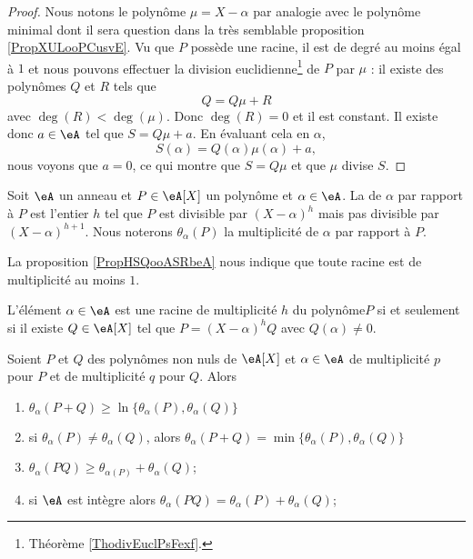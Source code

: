 \begin{proof}
    Nous notons le polynôme \( \mu=X-\alpha\) par analogie avec le polynôme minimal dont il sera question dans la très semblable proposition \ref{PropXULooPCusvE}. 
    Vu que \( P\) possède une racine, il est de degré au moins égal à \( 1\) et nous pouvons effectuer la division euclidienne\footnote{Théorème \ref{ThodivEuclPsFexf}.} de \( P\) par \( \mu\) : il existe des polynômes \( Q\) et \( R\) tels que
    \begin{equation}
        Q=Q\mu+R
    \end{equation}
    avec \( \deg(R)<\deg(\mu)\). Donc \( \deg(R)=0\) et il est constant. Il existe donc \( a\in \eA\) tel que \( S=Q\mu+a\). En évaluant cela en \( \alpha\),
    \begin{equation}
        S(\alpha)=Q(\alpha)\mu(\alpha)+a,
    \end{equation}
    nous voyons que \( a=0\), ce qui montre que \( S=Q\mu\) et que \( \mu\) divise \( S\).
\end{proof}

Soit \( \eA\) un anneau et \( P\in \eA[X]\) un polynôme et \( \alpha\in \eA\). La  de \( \alpha\) par rapport à \( P\) est l'entier \( h\) tel que \( P\) est divisible par \( (X-\alpha)^h\) mais pas divisible par \( (X-\alpha)^{h+1}\).  Nous noterons \( \theta_{\alpha}(P)\) la multiplicité de \( \alpha\) par rapport à \( P\).

La proposition \ref{PropHSQooASRbeA} nous indique que toute racine est de multiplicité au moins \( 1\).

\begin{proposition}     \label{PropahQQpA}
    L'élément \( \alpha\in \eA\) est une racine de multiplicité \( h\) du polynôme\( P\) si et seulement si il existe \( Q\in\eA[X]\) tel que \( P=(X-\alpha)^hQ\) avec \( Q(\alpha)\neq 0\).
\end{proposition}

\begin{lemma}       \label{LemIeLhpc}
    Soient \( P\) et \( Q\) des polynômes non nuls de \( \eA[X]\) et \( \alpha\in \eA\) de multiplicité \( p\) pour \( P\) et de multiplicité \( q\) pour \( Q\). Alors
    \begin{enumerate}
        \item
            \( \theta_{\alpha}(P+Q)\geq\ln\{ \theta_{\alpha}(P),\theta_{\alpha}(Q) \}\)
        \item
            si \( \theta_{\alpha}(P)\neq \theta_{\alpha}(Q)\), alors \( \theta_{\alpha}(P+Q)=\min\{ \theta_{\alpha}(P),\theta_{\alpha}(Q) \}\)
        \item
            \( \theta_{\alpha}(PQ)\geq \theta_{\alpha(P)}+\theta_{\alpha}(Q)\);
        \item       \label{ItemIeLhpciv}
            si \(\eA \) est intègre alors \( \theta_{\alpha}(PQ)= \theta_{\alpha}(P)+\theta_{\alpha}(Q)\);
    \end{enumerate}
\end{lemma}

